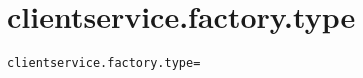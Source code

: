\section{clientservice.factory.type}
\label{configuration:ClientserviceFactoryType}
\ClearAPI
\TODO
\begin{lstlisting}[style=Props,caption={Usage example for \textit{clientservice.factory.type}}]
clientservice.factory.type=
\end{lstlisting}